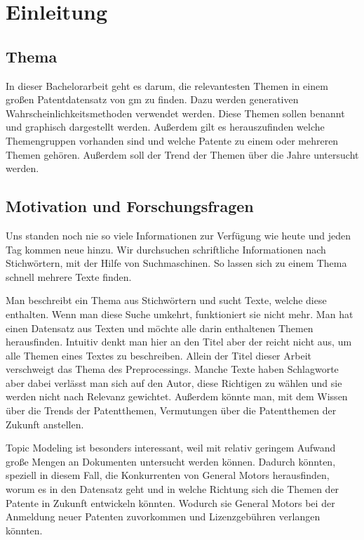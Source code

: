 \lstset{language=C}

%
%

\chapter{Einleitung}
\section{Thema}
In dieser Bachelorarbeit geht es darum, die relevantesten Themen in einem großen Patentdatensatz von \gls{gm} zu finden. Dazu werden generativen Wahrscheinlichkeitsmethoden verwendet werden. Diese Themen sollen benannt und graphisch dargestellt werden. Außerdem gilt es herauszufinden welche Themengruppen vorhanden sind und welche Patente zu einem oder mehreren Themen gehören. Außerdem soll der Trend der Themen über die Jahre untersucht werden.

\section{Motivation und Forschungsfragen}
Uns standen noch nie so viele Informationen zur Verfügung wie heute und jeden Tag kommen neue hinzu. Wir durchsuchen schriftliche Informationen nach Stichwörtern, mit der Hilfe von Suchmaschinen. So lassen sich zu einem Thema schnell mehrere Texte finden.

Man beschreibt ein Thema aus Stichwörtern und sucht Texte, welche diese enthalten. Wenn man diese Suche umkehrt, funktioniert sie nicht mehr. Man hat einen Datensatz aus Texten und möchte alle darin enthaltenen Themen herausfinden. Intuitiv denkt man hier an den Titel aber der reicht nicht aus, um alle Themen eines Textes zu beschreiben. Allein der Titel dieser Arbeit verschweigt das Thema des Preprocessings. Manche Texte haben Schlagworte aber dabei verlässt man sich auf den Autor, diese Richtigen zu wählen und sie werden nicht nach Relevanz gewichtet. Außerdem könnte man, mit dem Wissen über die Trends der Patentthemen, Vermutungen über die Patentthemen der Zukunft anstellen.

Topic Modeling ist besonders interessant, weil mit relativ geringem Aufwand große Mengen an Dokumenten untersucht werden können. Dadurch könnten, speziell in diesem Fall, die Konkurrenten von General Motors herausfinden, worum es in den Datensatz geht und in welche Richtung sich die Themen der Patente in Zukunft entwickeln könnten. Wodurch sie General Motors bei der Anmeldung neuer Patenten zuvorkommen und Lizenzgebühren verlangen könnten.


